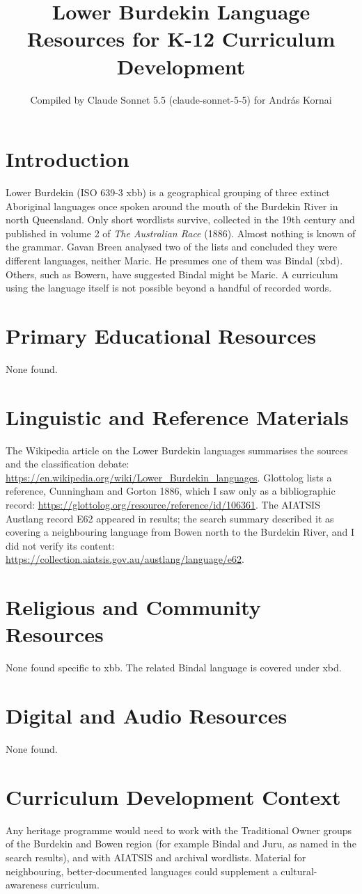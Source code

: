 \documentclass[12pt]{article}
\title{Lower Burdekin Language Resources for K-12 Curriculum Development}
\author{Compiled by Claude Sonnet 5.5 (claude-sonnet-5-5) for Andr\'as Kornai}
\date{}
\begin{document}
\maketitle

\section{Introduction}
Lower Burdekin (ISO 639-3 xbb) is a geographical grouping of three extinct Aboriginal languages once spoken around the mouth of the Burdekin River in north Queensland. Only short wordlists survive, collected in the 19th century and published in volume 2 of \emph{The Australian Race} (1886). Almost nothing is known of the grammar. Gavan Breen analysed two of the lists and concluded they were different languages, neither Maric. He presumes one of them was Bindal (xbd). Others, such as Bowern, have suggested Bindal might be Maric. A curriculum using the language itself is not possible beyond a handful of recorded words.

\section{Primary Educational Resources}
None found.

\section{Linguistic and Reference Materials}
The Wikipedia article on the Lower Burdekin languages summarises the sources and the classification debate: \url{https://en.wikipedia.org/wiki/Lower_Burdekin_languages}. Glottolog lists a reference, Cunningham and Gorton 1886, which I saw only as a bibliographic record: \url{https://glottolog.org/resource/reference/id/106361}. The AIATSIS Austlang record E62 appeared in results; the search summary described it as covering a neighbouring language from Bowen north to the Burdekin River, and I did not verify its content: \url{https://collection.aiatsis.gov.au/austlang/language/e62}.

\section{Religious and Community Resources}
None found specific to xbb. The related Bindal language is covered under xbd.

\section{Digital and Audio Resources}
None found.

\section{Curriculum Development Context}
Any heritage programme would need to work with the Traditional Owner groups of the Burdekin and Bowen region (for example Bindal and Juru, as named in the search results), and with AIATSIS and archival wordlists. Material for neighbouring, better-documented languages could supplement a cultural-awareness curriculum.
\end{document}
